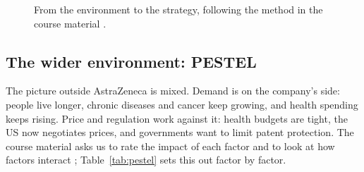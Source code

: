 \begin{figure}[H]\centering
{}
\caption{From the environment to the strategy, following the method in the course material \cite[pp.~17--29]{PLAN}.}
\label{fig:metodo}
\end{figure}
\subsection{The wider environment: PESTEL}
The picture outside AstraZeneca is mixed. Demand is on the company's side: people live longer, chronic diseases and cancer keep growing, and health spending keeps rising. Price and regulation work against it: health budgets are tight, the US now negotiates prices, and governments want to limit patent protection. The course material asks us to rate the impact of each factor and to look at how factors interact \cite[p.~19]{PLAN}; Table~\ref{tab:pestel} sets this out factor by factor.


